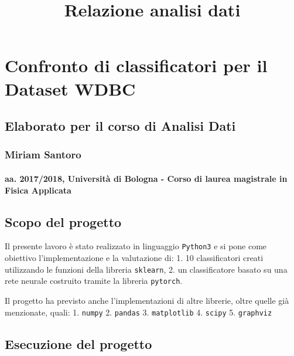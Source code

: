 \documentclass[11pt]{article}
\title{Relazione analisi dati}
\begin{document}
    
    
    \maketitle
    
    

    
    \section{Confronto di classificatori per il Dataset
WDBC}\label{confronto-di-classificatori-per-il-dataset-wdbc}

\subsection{Elaborato per il corso di Analisi
Dati}\label{elaborato-per-il-corso-di-analisi-dati}

\subsubsection{Miriam Santoro}\label{miriam-santoro}

\paragraph{aa. 2017/2018, Università di Bologna - Corso di laurea
magistrale in Fisica
Applicata}\label{aa.-20172018-universituxe0-di-bologna---corso-di-laurea-magistrale-in-fisica-applicata}

    \subsection{Scopo del progetto}\label{scopo-del-progetto}

    Il presente lavoro è stato realizzato in linguaggio \texttt{Python3} e
si pone come obiettivo l'implementazione e la valutazione di: 1. 10
classificatori creati utilizzando le funzioni della libreria
\texttt{sklearn}, 2. un classificatore basato su una rete neurale
costruito tramite la libreria \texttt{pytorch}.

Il progetto ha previsto anche l'implementazioni di altre librerie, oltre
quelle già menzionate, quali: 1. \texttt{numpy} 2. \texttt{pandas} 3.
\texttt{matplotlib} 4. \texttt{scipy} 5. \texttt{graphviz}

    \subsection{Esecuzione del progetto}\label{esecuzione-del-progetto}
\end{document}
